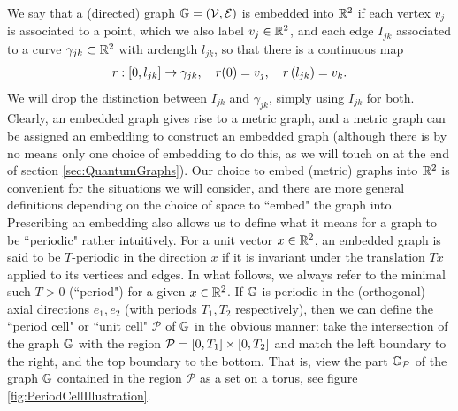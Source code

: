 We say that a (directed) graph $\mathbb{G} = \left( \mathcal{V},\mathcal{E} \right)$ is embedded into $\mathbb{R}^2$ if each vertex $v_j$ is associated to a point, which we also label $v_j\in\mathbb{R}^2$, and each edge $I_{jk}$ associated to a curve $\gamma_{jk}\subset\mathbb{R}^2$ with arclength $l_{jk}$, so that there is a continuous map
\begin{align} \label{eq:GeneralCurveParam}
	r: \left[ 0,l_{jk} \right] \rightarrow \gamma_{jk}, \quad r(0) = v_j, \quad r\left( l_{jk} \right) = v_k.
\end{align}
We will drop the distinction between $I_{jk}$ and $\gamma_{jk}$, simply using $I_{jk}$ for both.
Clearly, an embedded graph gives rise to a metric graph, and a metric graph can be assigned an embedding to construct an embedded graph (although there is by no means only one choice of embedding to do this, as we will touch on at the end of section \ref{sec:QuantumGraphs}).
Our choice to embed (metric) graphs into $\mathbb{R}^2$ is convenient for the situations we will consider, and there are more general definitions depending on the choice of space to ``embed" the graph into.
Prescribing an embedding also allows us to define what it means for a graph to be ``periodic" rather intuitively.
For a unit vector $x\in\mathbb{R}^2$, an embedded graph is said to be $T$-periodic in the direction $x$ if it is invariant under the translation $Tx$ applied to its vertices and edges.
In what follows, we always refer to the minimal such $T>0$ (``period") for a given $x\in\mathbb{R}^2$.
If $\mathbb{G}$ is periodic in the (orthogonal) axial directions $e_1, e_2$ (with periods $T_1, T_2$ respectively), then we can define the ``period cell" or ``unit cell" $\mathcal{P}$ of $\mathbb{G}$ in the obvious manner: take the intersection of the graph $\mathbb{G}$ with the region $\mathcal{P} = \left[ 0,T_1 \right]\times\left[ 0,T_2 \right]$ and match the left boundary to the right, and the top boundary to the bottom.
That is, view the part $\mathbb{G}_{\mathcal{P}}$ of the graph $\mathbb{G}$ contained in the region $\mathcal{P}$ as a set on a torus, see figure \ref{fig:PeriodCellIllustration}.
